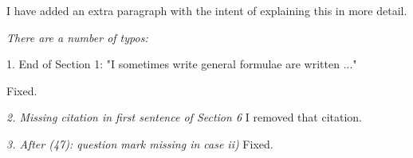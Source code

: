 \documentclass[a4paper, 12pt]{article}
\renewcommand{\quote}{\em}
\begin{document}
I have added an extra paragraph with the intent of explaining this in more
detail.


{\quote
There are a number of typos:

1. End of Section 1: "I sometimes write general formulae are written ..."}
Fixed.

{\quote
2. Missing citation in first sentence of Section 6}
I removed that citation.

{\quote
3. After (47): question mark missing in case ii)}
Fixed.





\end{document}
